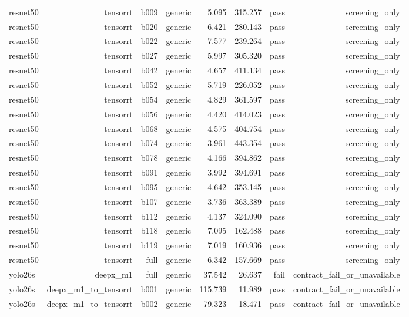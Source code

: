\begin{table}[t]
\begin{tabular}{lrrrrrrr}
resnet50 & tensorrt & b009 & generic & 5.095 & 315.257 & pass & screening\_only \\
resnet50 & tensorrt & b020 & generic & 6.421 & 280.143 & pass & screening\_only \\
resnet50 & tensorrt & b022 & generic & 7.577 & 239.264 & pass & screening\_only \\
resnet50 & tensorrt & b027 & generic & 5.997 & 305.320 & pass & screening\_only \\
resnet50 & tensorrt & b042 & generic & 4.657 & 411.134 & pass & screening\_only \\
resnet50 & tensorrt & b052 & generic & 5.719 & 226.052 & pass & screening\_only \\
resnet50 & tensorrt & b054 & generic & 4.829 & 361.597 & pass & screening\_only \\
resnet50 & tensorrt & b056 & generic & 4.420 & 414.023 & pass & screening\_only \\
resnet50 & tensorrt & b068 & generic & 4.575 & 404.754 & pass & screening\_only \\
resnet50 & tensorrt & b074 & generic & 3.961 & 443.354 & pass & screening\_only \\
resnet50 & tensorrt & b078 & generic & 4.166 & 394.862 & pass & screening\_only \\
resnet50 & tensorrt & b091 & generic & 3.992 & 394.691 & pass & screening\_only \\
resnet50 & tensorrt & b095 & generic & 4.642 & 353.145 & pass & screening\_only \\
resnet50 & tensorrt & b107 & generic & 3.736 & 363.389 & pass & screening\_only \\
resnet50 & tensorrt & b112 & generic & 4.137 & 324.090 & pass & screening\_only \\
resnet50 & tensorrt & b118 & generic & 7.095 & 162.488 & pass & screening\_only \\
resnet50 & tensorrt & b119 & generic & 7.019 & 160.936 & pass & screening\_only \\
resnet50 & tensorrt & full & generic & 6.342 & 157.669 & pass & screening\_only \\
yolo26s & deepx\_m1 & full & generic & 37.542 & 26.637 & fail & contract\_fail\_or\_unavailable \\
yolo26s & deepx\_m1\_to\_tensorrt & b001 & generic & 115.739 & 11.989 & pass & contract\_fail\_or\_unavailable \\
yolo26s & deepx\_m1\_to\_tensorrt & b002 & generic & 79.323 & 18.471 & pass & contract\_fail\_or\_unavailable \\

\end{tabular}
\end{table}

